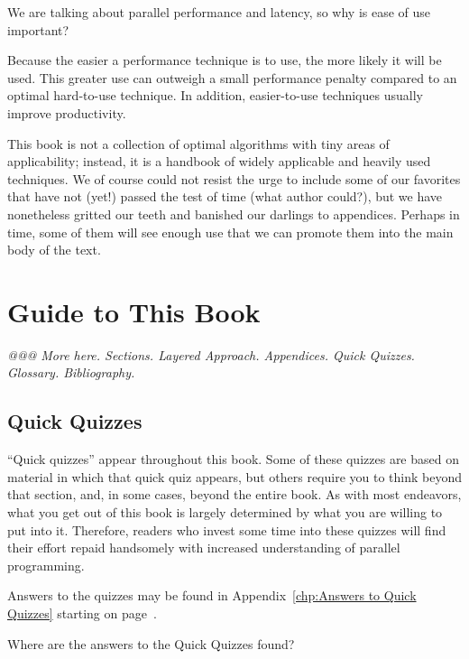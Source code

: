 We are talking about parallel performance and latency,
so why is ease of use important?

Because the easier a performance technique is to use, the more likely
it will be used.
This greater use can outweigh a small performance penalty compared
to an optimal hard-to-use technique.
In addition, easier-to-use techniques usually improve productivity.

This book is not a collection of optimal algorithms with tiny areas of
applicability; instead, it is a handbook of widely applicable and heavily
used techniques.
We of course could not resist the urge to include some of our favorites
that have not (yet!) passed the test of time (what author could?), but
we have nonetheless gritted our teeth and banished our darlings to
appendices.
Perhaps in time, some of them will see enough use that we can promote
them into the main body of the text.

\section{Guide to This Book}
\label{sec:intro:Guide to This Book}

\emph{@@@ More here.  Sections.  Layered Approach.  Appendices.
Quick Quizzes.  Glossary.  Bibliography.}

\subsection{Quick Quizzes}

``Quick quizzes'' appear throughout this book.
Some of these quizzes are based on material in which that quick quiz
appears, but others require you to think beyond that section, and,
in some cases, beyond the entire book.
As with most endeavors, what you get out of this book is largely
determined by what you are willing to put into it.
Therefore, readers who invest some time into these quizzes will
find their effort repaid handsomely with increased understanding
of parallel programming.

Answers to the quizzes may be found
in
Appendix~\ref{chp:Answers to Quick Quizzes} starting on
page~\pageref{chp:Answers to Quick Quizzes}.

\QuickQuiz{}
	Where are the answers to the Quick Quizzes found?
 \QuickQuizEnd

